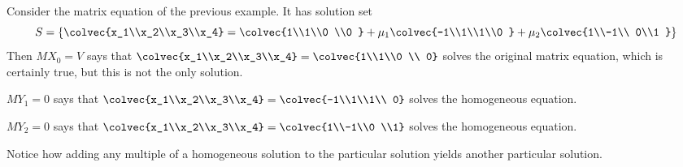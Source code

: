 \begin{example}
Consider the matrix equation of the previous example. It has  solution set
\[S = \left\{\colvec{x_1\\x_2\\x_3\\x_4} = \colvec{1\\1\\0 \\0 } + \mu_1 \colvec{-1\\1\\1\\0 } + \mu_2 \colvec{1\\-1\\ 0\\1 } \right\} \]
Then $MX_0=V$ says that $\colvec{x_1\\x_2\\x_3\\x_4} = 
\colvec{1\\1\\0 \\ 0}$ solves the original matrix equation, which is certainly true, but this is not the only solution.

$MY_1=0$ says that $\colvec{x_1\\x_2\\x_3\\x_4} = \colvec{-1\\1\\1\\ 0}
$ solves the homogeneous equation.

\vspace{2mm}

$MY_2=0$ says that $\colvec{x_1\\x_2\\x_3\\x_4} = 
\colvec{1\\-1\\0 \\1}$ solves the homogeneous equation.

\vspace{2mm}

\noindent
Notice how adding any multiple of a homogeneous solution to the particular solution yields another particular solution.
\end{example}

%
%

